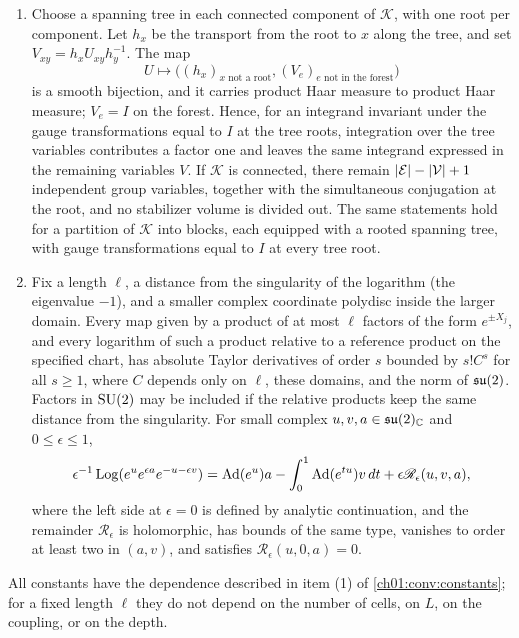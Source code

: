 \begin{lemma}
\begin{enumerate}
\item Choose a spanning tree in each connected component of $\mathcal K$, with one root per component. Let $h_x$ be the transport from the root to $x$ along the tree, and set $V_{xy}=h_xU_{xy}h_y^{-1}$. The map
\[
 U\longmapsto\bigl((h_x)_{x\text{ not a root}},(V_e)_{e\text{ not in the forest}}\bigr)
\]
is a smooth bijection, and it carries product Haar measure to product Haar measure; $V_e=I$ on the forest. Hence, for an integrand invariant under the gauge transformations equal to $I$ at the tree roots, integration over the tree variables contributes a factor one and leaves the same integrand expressed in the remaining variables $V$. If $\mathcal K$ is connected, there remain $\lvert \mathcal E\rvert-\lvert \mathcal V\rvert+1$ independent group variables, together with the simultaneous conjugation at the root, and no stabilizer volume is divided out. The same statements hold for a partition of $\mathcal K$ into blocks, each equipped with a rooted spanning tree, with gauge transformations equal to $I$ at every tree root.
\item Fix a length $\ell$, a distance from the singularity of the logarithm (the eigenvalue $-1$), and a smaller complex coordinate polydisc inside the larger domain. Every map given by a product of at most $\ell$ factors of the form $e^{\pm X_j}$, and every logarithm of such a product relative to a reference product on the specified chart, has absolute Taylor derivatives of order $s$ bounded by $s!C^s$ for all $s\ge1$, where $C$ depends only on $\ell$, these domains, and the norm of $\mathfrak{su}(2)$. Factors in $\mathrm{SU}(2)$ may be included if the relative products keep the same distance from the singularity. For small complex $u,v,a\in\mathfrak{su}(2)_\mathbb C$ and $0\le\epsilon\le1$,
\[
 \epsilon^{-1}\operatorname{Log}(e^ue^{\epsilon a}e^{-u-\epsilon v})
 =\operatorname{Ad}(e^u)a-\int_0^1\operatorname{Ad}(e^{tu})v\,dt+\epsilon\mathscr R_\epsilon(u,v,a),
\]
where the left side at $\epsilon=0$ is defined by analytic continuation, and the remainder $\mathscr R_\epsilon$ is holomorphic, has bounds of the same type, vanishes to order at least two in $(a,v)$, and satisfies $\mathscr R_\epsilon(u,0,a)=0$.
\end{enumerate}
All constants have the dependence described in item (1) of \cref{ch01:conv:constants}; for a fixed length $\ell$ they do not depend on the number of cells, on $L$, on the coupling, or on the depth.
\end{lemma}

